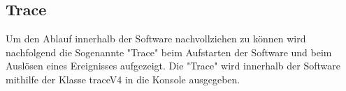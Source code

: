 \subsection{Trace} \label{trace}
Um den Ablauf innerhalb der Software nachvollziehen zu können wird nachfolgend die Sogenannte "Trace" beim Aufstarten der Software und beim Auslösen eines Ereignisses aufgezeigt. Die "Trace" wird innerhalb der Software mithilfe der Klasse traceV4 in die Konsole ausgegeben.



